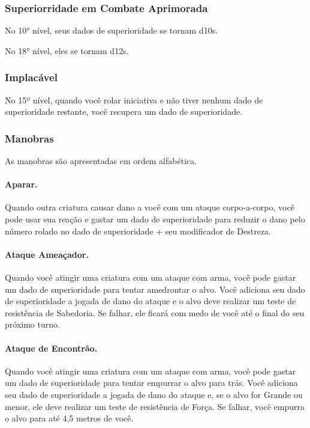 \begin{multicols}{2}
\subsubsection{Superiorridade em Combate Aprimorada}%

No 10° nível, seus dados de superioridade se tornam d10s.

No 18° nível, eles se tornam d12s.

\subsubsection{Implacável}%

No 15º nível, quando você rolar iniciativa e não tiver nenhum dado de
superioridade restante, você recupera um dado de superioridade.

\subsubsection{Manobras}%

As manobras são apresentadas em ordem alfabética.

\paragraph{Aparar.} Quando outra criatura causar dano a você com um ataque
corpo-a-corpo, você pode usar sua reação e gastar um dado de superioridade para
reduzir o dano pelo número rolado no dado de superioridade + seu modificador de
Destreza.

\paragraph{Ataque Ameaçador.} Quando você atingir uma criatura com um ataque com
arma, você pode gastar um dado de superioridade para tentar amedrontar o alvo.
Você adiciona seu dado de superioridade a jogada de dano do ataque e o alvo deve
realizar um teste de resistência de Sabedoria. Se falhar, ele ficará com medo de
você até o final do seu próximo turno.

\paragraph{Ataque de Encontrão.} Quando você atingir uma criatura com um ataque
com arma, você pode gastar um dado de superioridade para tentar empurrar o alvo
para trás. Você adiciona seu dado de superioridade a jogada de dano do ataque e,
se o alvo for Grande ou menor, ele deve realizar um teste de resistência de
Força. Se falhar, você empurra o alvo para até 4,5 metros de você.


\end{multicols}
